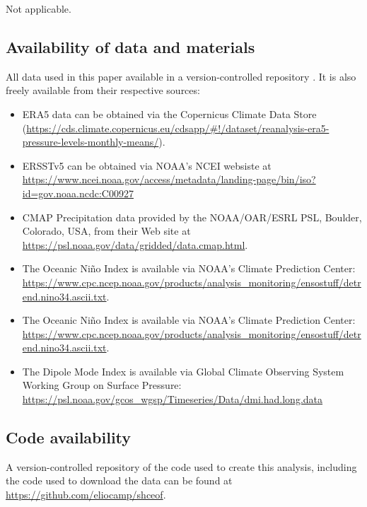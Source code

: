 \documentclass[pdflatex,sn-basic]{sn-jnl}
\theoremstyle{thmstyleone}%
\theoremstyle{thmstyletwo}%
\theoremstyle{thmstylethree}%
\begin{document}
Not applicable.

\hypertarget{availability-of-data-and-materials}{%
\subsection*{Availability of data and materials}\label{availability-of-data-and-materials}}

All data used in this paper available in a version-controlled repository \citep{campitelli2022a}.
It is also freely available from their respective sources:

\begin{itemize}
\item
  ERA5 data can be obtained via the Copernicus Climate Data Store (\url{https://cds.climate.copernicus.eu/cdsapp/\#!/dataset/reanalysis-era5-pressure-levels-monthly-means/}).
\item
  ERSSTv5 can be obtained via NOAA's NCEI websiste at \url{https://www.ncei.noaa.gov/access/metadata/landing-page/bin/iso?id=gov.noaa.ncdc:C00927}
\item
  CMAP Precipitation data provided by the NOAA/OAR/ESRL PSL, Boulder, Colorado, USA, from their Web site at \url{https://psl.noaa.gov/data/gridded/data.cmap.html}.
\item
  The Oceanic Niño Index is available via NOAA's Climate Prediction Center: \url{https://www.cpc.ncep.noaa.gov/products/analysis_monitoring/ensostuff/detrend.nino34.ascii.txt}.
\item
  The Oceanic Niño Index is available via NOAA's Climate Prediction Center: \url{https://www.cpc.ncep.noaa.gov/products/analysis_monitoring/ensostuff/detrend.nino34.ascii.txt}.
\item
  The Dipole Mode Index is available via Global Climate Observing System Working Group on Surface Pressure: \url{https://psl.noaa.gov/gcos_wgsp/Timeseries/Data/dmi.had.long.data}
\end{itemize}

\hypertarget{code-availability}{%
\subsection*{Code availability}\label{code-availability}}

A version-controlled repository of the code used to create this analysis, including the code used to download the data can be found at \url{https://github.com/eliocamp/shceof}.
\end{document}
